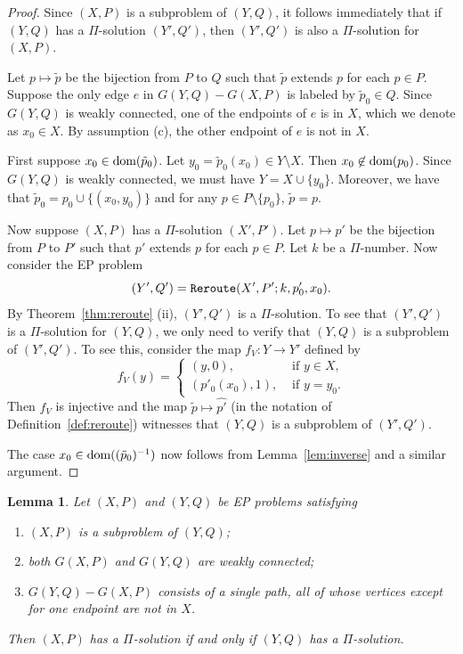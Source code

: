 \documentclass[10pt,a4paper]{amsart}
\newtheorem{lemma}[theorem]{Lemma}
\theoremstyle{definition}
\newcommand{\dom}{{\mbox{\rm dom}}}
\theoremstyle{definition}
\numberwithin{equation}{section}
\begin{document}
\begin{proof} Since $(X, P)$ is a subproblem of $(Y, Q)$, it follows immediately that if $(Y, Q)$ has a $\Pi$-solution $(Y', Q')$, then $(Y', Q')$ is also a $\Pi$-solution for $(X, P)$. 

Let $p\mapsto \tilde{p}$ be the bijection from $P$ to $Q$ such that $\tilde{p}$ extends $p$ for each $p\in P$. Suppose the only edge $e$ in $G(Y, Q)-G(X, P)$ is labeled by $\tilde{p}_0\in Q$. Since $G(Y, Q)$ is weakly connected, one of the endpoints of $e$ is in $X$, which we denote as $x_0\in X$. By assumption (c), the other endpoint of $e$ is not in $X$. 

First suppose $x_0\in \mbox{\rm dom}(\tilde{p}_0)$. Let $y_0=\tilde{p}_0(x_0)\in Y\setminus X$. Then $x_0\not\in \dom(p_0)$.  Since $G(Y, Q)$ is weakly connected, we must have $Y=X\cup\{y_0\}$. Moreover, we have that $\tilde{p}_0=p_0\cup\{(x_0, y_0)\}$ and for any $p\in P\setminus\{p_0\}$, $\tilde{p}=p$.

Now suppose $(X, P)$ has a $\Pi$-solution $(X', P')$. Let $p\mapsto p'$ be the bijection from $P$ to $P'$ such that $p'$ extends $p$ for each $p\in P$. Let $k$ be a $\Pi$-number. Now consider the EP problem 
$$ (Y', Q')=\mbox{\tt Reroute}(X', P'; k, p'_0, x_0). $$
By Theorem~\ref{thm:reroute} (ii), $(Y', Q')$ is a $\Pi$-solution. To see that $(Y', Q')$ is a $\Pi$-solution for $(Y, Q)$, we only need to verify that $(Y, Q)$ is a subproblem of $(Y', Q')$. To see this, consider the map $f_V\colon Y\to Y'$ defined by
$$ f_V(y)=\left\{\begin{array}{ll} (y, 0), & \mbox{ if $y\in X$,} \\ (p'_0(x_0), 1), & \mbox{ if $y=y_0$.}\end{array}\right. $$
Then $f_V$ is injective and the map $\tilde{p}\mapsto \widehat{p'}$ (in the notation of Definition~\ref{def:reroute}) witnesses that $(Y, Q)$ is a subproblem of $(Y', Q')$.

The case $x_0\in \dom((\tilde{p}_0)^{-1})$ now follows from Lemma~\ref{lem:inverse} and a similar argument.
\end{proof}

\begin{lemma}\label{lem:singlepathextension} Let $(X, P)$ and $(Y, Q)$ be EP problems satisfying
\begin{enumerate}
\item[\rm (a)] $(X, P)$ is a subproblem of $(Y, Q)$; 
\item[\rm (b)] both $G(X, P)$ and $G(Y, Q)$ are weakly connected;
\item[\rm (c)] $G(Y, Q)-G(X, P)$ consists of a single path, all of whose vertices except for one endpoint are not in $X$.
\end{enumerate}
Then $(X, P)$ has a $\Pi$-solution if and only if $(Y, Q)$ has a $\Pi$-solution.
\end{lemma}
\end{document}
